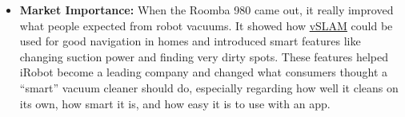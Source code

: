 \begin{itemize}
\begin{itemize}
            \item \textbf{Automatic Recharging and Resuming:} If the battery gets low while cleaning, the Roomba 980 is designed to go back to its charging station by itself. After it has recharged enough, it can start cleaning again from where it stopped. This is helpful for cleaning large areas without needing someone to do anything.
        \end{itemize}
    \item \textbf{Market Importance:} When the Roomba 980 came out, it really improved what people expected from robot vacuums. It showed how \hyperref[term:vslam]{vSLAM} could be used for good navigation in homes and introduced smart features like changing suction power and finding very dirty spots. These features helped iRobot become a leading company and changed what consumers thought a ``smart'' vacuum cleaner should do, especially regarding how well it cleans on its own, how smart it is, and how easy it is to use with an app.
\end{itemize}

